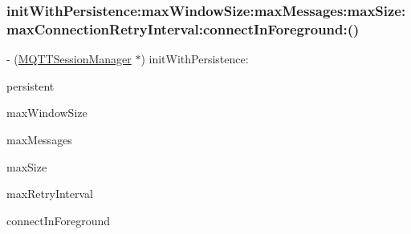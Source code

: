 \subsubsection{\texorpdfstring{init\+With\+Persistence\+:max\+Window\+Size\+:max\+Messages\+:max\+Size\+:max\+Connection\+Retry\+Interval\+:connect\+In\+Foreground\+:()}{initWithPersistence:maxWindowSize:maxMessages:maxSize:maxConnectionRetryInterval:connectInForeground:()}}
{\footnotesize\ttfamily -\/ (\hyperlink{interface_m_q_t_t_session_manager}{M\+Q\+T\+T\+Session\+Manager} $\ast$) init\+With\+Persistence\+: \begin{DoxyParamCaption}\item[{(B\+O\+OL)}]{persistent }\item[{maxWindowSize:(N\+S\+U\+Integer)}]{max\+Window\+Size }\item[{maxMessages:(N\+S\+U\+Integer)}]{max\+Messages }\item[{maxSize:(N\+S\+U\+Integer)}]{max\+Size }\item[{maxConnectionRetryInterval:(N\+S\+Time\+Interval)}]{max\+Retry\+Interval }\item[{connectInForeground:(B\+O\+OL)}]{connect\+In\+Foreground }\end{DoxyParamCaption}}

